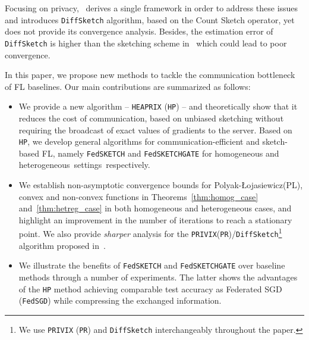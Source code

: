 \documentclass[sigconf, anonymous, review]{acmart}
\newcommand{\pl}{Polyak-\L{}ojasiewicz}
\begin{document}
Focusing on privacy,~\citep{li2019privacy} derives a single framework in order to address these issues and introduces \texttt{DiffSketch} algorithm, based on the Count Sketch operator, yet does not provide its convergence analysis.
Besides, the estimation error of \texttt{DiffSketch} is higher than the sketching scheme in~\cite{ivkin2019communication} which could lead to poor convergence. 
 
 
\vspace{0.05in}
 
 In this paper, we propose new methods to tackle the communication bottleneck of FL baselines.
 Our main contributions are summarized as follows:
\begin{itemize}\vspace{-0.05in}
    \item We provide a new algorithm -- \texttt{HEAPRIX} (\texttt{HP}) -- and theoretically show that it reduces the cost of communication, based on unbiased sketching without requiring the broadcast of exact values of gradients to the server. 
    Based on \texttt{HP}, we develop general algorithms for communication-efficient and sketch-based FL, namely \texttt{FedSKETCH} and \texttt{FedSKETCHGATE} for  homogeneous and heterogeneous~settings~respectively.
    \item We establish non-asymptotic convergence bounds for \pl\:(PL), convex and non-convex functions in Theorems~\ref{thm:homog_case} and~\ref{thm:hetreg_case} in both homogeneous and heterogeneous cases, and highlight an improvement in the number of iterations to reach a stationary point.
We also provide \emph{sharper} analysis for the \texttt{PRIVIX}(\texttt{PR})/\texttt{DiffSketch}\footnote{We use \texttt{PRIVIX} (\texttt{PR}) and \texttt{DiffSketch} \citep{li2019privacy} interchangeably throughout the paper.} algorithm proposed in~\cite{li2019privacy}.
    \item We illustrate the benefits of \texttt{FedSKETCH} and \texttt{FedSKETCHGATE} over baseline methods through a number of experiments. 
    The latter shows the advantages of the \texttt{HP} method achieving comparable test accuracy as Federated SGD (\texttt{FedSGD}) while compressing the exchanged information.
\end{itemize}
\end{document}
